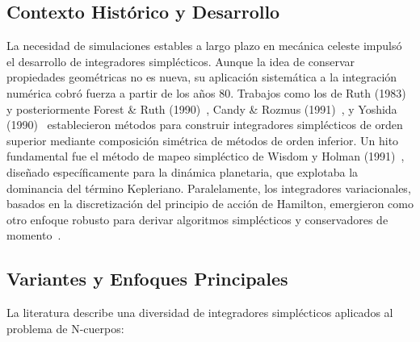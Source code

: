 \subsection{Contexto Histórico y Desarrollo}
La necesidad de simulaciones estables a largo plazo en mecánica celeste impulsó el desarrollo de integradores simplécticos. Aunque la idea de conservar propiedades geométricas no es nueva, su aplicación sistemática a la integración numérica cobró fuerza a partir de los años 80. Trabajos como los de Ruth (1983)~\cite{yoshida1990} y posteriormente Forest \& Ruth (1990)~\cite{yoshida1990}, Candy \& Rozmus (1991)~\cite{yoshida1993}, y Yoshida (1990)~\cite{farr2007, yoshida1993} establecieron métodos para construir integradores simplécticos de orden superior mediante composición simétrica de métodos de orden inferior. Un hito fundamental fue el método de mapeo simpléctico de Wisdom y Holman (1991)~\cite{wisdom1991}, diseñado específicamente para la dinámica planetaria, que explotaba la dominancia del término Kepleriano. Paralelamente, los integradores variacionales, basados en la discretización del principio de acción de Hamilton, emergieron como otro enfoque robusto para derivar algoritmos simplécticos y conservadores de momento~\cite{farr2007, Hernandez2015}.

\subsection{Variantes y Enfoques Principales}
La literatura describe una diversidad de integradores simplécticos aplicados al problema de N-cuerpos:


